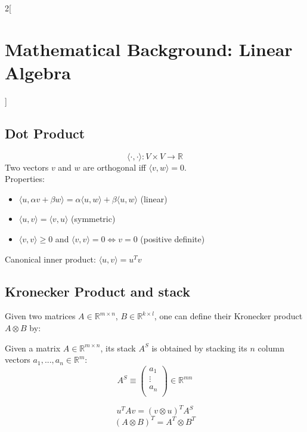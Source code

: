 \documentclass[oneside,fontsize=11pt,paper=a4]{scrartcl}
\newcommand{\A}[5]{\left#1\begin{array}{ccc}
{#2}_{11}B & \cdots & {#2}_{1#4}B\\
\vdots & \ddots & \vdots\\
{#2}_{#31}B & \cdots & {#2}_{#3#4}B
\end{array}\right#5}
\begin{document}
\begin{multicols}{2}[\section{Mathematical Background: Linear Algebra}]
\subsection{Dot Product}
\begin{equation*}
	\langle \cdot, \cdot \rangle: V \times V \rightarrow \mathbb{R}
\end{equation*}
Two vectors $v$ and $w$ are orthogonal iff $\langle v, w \rangle = 0$. \\

Properties:
\begin{itemize}
	\item $\langle u, \alpha v + \beta w \rangle = \alpha \langle u,w \rangle + \beta \langle u,w \rangle$ (linear)
	\item $\langle u,v \rangle = \langle v,u \rangle$ (symmetric)
	\item $\langle v, v \rangle \geq 0 $ and $ \langle v,v \rangle = 0 \iff v = 0$ (positive definite)
\end{itemize}
Canonical inner product: $\langle u,v \rangle = u^T v$


\subsection{Kronecker Product and stack}
Given two matrices $A \in \mathbb{R}^{m \times n}$, $B \in \mathbb{R}^{k \times l}$, one can define their Kronecker product $A \otimes B$ by:

Given a matrix $A \in \mathbb{R}^{m \times n}$, its stack $A^S$ is obtained by stacking its $n$ column vectors $a_1, ..., a_n \in \mathbb{R}^{m}$:
\begin{equation*}
	A^S \equiv 
	\begin{pmatrix}
		a_1 \\
		\vdots \\
		a_n \\
	\end{pmatrix}	
	\in \mathbb{R}^{mn}
\end{equation*}

\begin{equation*}
	u^T A v = (v \otimes u)^T A^S
\end{equation*}
\begin{equation*}
	(A \otimes B)^T = A^T \otimes B^T
\end{equation*}


\end{multicols}
\end{document}
